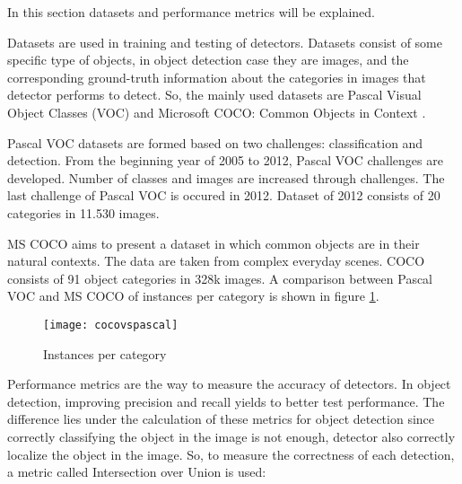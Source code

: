 \documentclass{article}
\begin{document}
\setlength{\parindent}{6ex}

\indent

In this section datasets and performance metrics will be explained. \par 
Datasets are used in training and testing of detectors. Datasets consist of some 
specific type of objects, in object detection case they are images, and the 
corresponding ground-truth information about the categories in images that 
detector performs to detect. So, the mainly used datasets are Pascal Visual Object 
Classes (VOC) \cite{pascalvoc} and Microsoft COCO: Common Objects in Context 
\cite{mscoco}. \par

Pascal VOC datasets are formed based on two challenges: classification and detection. From the 
beginning year of 2005 to 2012, Pascal VOC challenges are developed. Number of classes and images 
are increased through challenges. The last challenge of Pascal VOC is occured in 2012. Dataset of 
2012 consists of 20 categories in 11.530 images. \par

MS COCO aims to present a dataset in which common objects are in their natural 
contexts. The data are taken from complex everyday scenes. COCO consists of 91 
object categories in 328k images. A comparison between Pascal VOC and MS COCO 
of instances per category is shown in figure \ref{fig:cocovspascal1}.

\begin{figure}
    \centering
    \texttt{[image: cocovspascal]}
    \caption{Instances per category}
    \label{fig:cocovspascal1}
\end{figure}
\indent

Performance metrics are the way to measure the accuracy of detectors. In object 
detection, improving precision and recall yields to better test performance. The 
difference lies under the calculation of these metrics for object detection since 
correctly classifying the object in the image is not enough, detector also correctly 
localize the object in the image. So, to measure the correctness of each detection, 
a metric called Intersection over Union is used:
\end{document}
